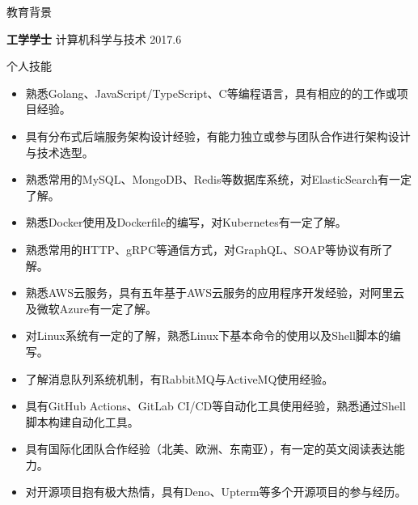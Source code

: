 \documentclass{resume} %
\begin{document}

\begin{rSection}{教育背景}

  {\bf 工学学士} 计算机科学与技术 \hfill {2017.6}

\end{rSection}

\begin{rSection}{个人技能}
  \begin{itemize}
    \itemsep -3pt {}
    \item 熟悉Golang、JavaScript/TypeScript、C等编程语言，具有相应的的工作或项目经验。
    \item 具有分布式后端服务架构设计经验，有能力独立或参与团队合作进行架构设计与技术选型。
    \item 熟悉常用的MySQL、MongoDB、Redis等数据库系统，对ElasticSearch有一定了解。
    \item 熟悉Docker使用及Dockerfile的编写，对Kubernetes有一定了解。
    \item 熟悉常用的HTTP、gRPC等通信方式，对GraphQL、SOAP等协议有所了解。
    \item 熟悉AWS云服务，具有五年基于AWS云服务的应用程序开发经验，对阿里云及微软Azure有一定了解。
    \item 对Linux系统有一定的了解，熟悉Linux下基本命令的使用以及Shell脚本的编写。
    \item 了解消息队列系统机制，有RabbitMQ与ActiveMQ使用经验。
    \item 具有GitHub Actions、GitLab CI/CD等自动化工具使用经验，熟悉通过Shell脚本构建自动化工具。
    \item 具有国际化团队合作经验（北美、欧洲、东南亚），有一定的英文阅读表达能力。
    \item 对开源项目抱有极大热情，具有Deno、Upterm等多个开源项目的参与经历。
  \end{itemize}
\end{rSection}
\end{document}
